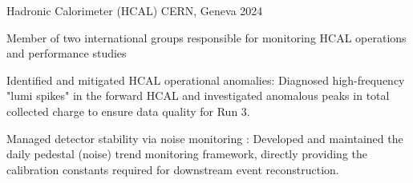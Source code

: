 \begin{cventries}
  \cventry
    {} %
    {Hadronic Calorimeter (HCAL)} %
    {CERN, Geneva} %
    {2024} %
    {
      \begin{cvitems} %
        \item {Member of two international groups responsible for monitoring HCAL operations and performance studies}
        \item {Identified and mitigated HCAL operational anomalies: Diagnosed high-frequency "lumi spikes" in the forward HCAL and investigated anomalous peaks in total collected charge to ensure data quality for Run 3.}
        \item {Managed detector stability via noise monitoring : Developed and maintained the daily pedestal (noise) trend monitoring framework, directly providing the calibration constants required for downstream event reconstruction.}
      \end{cvitems}
    }



\end{cventries}
